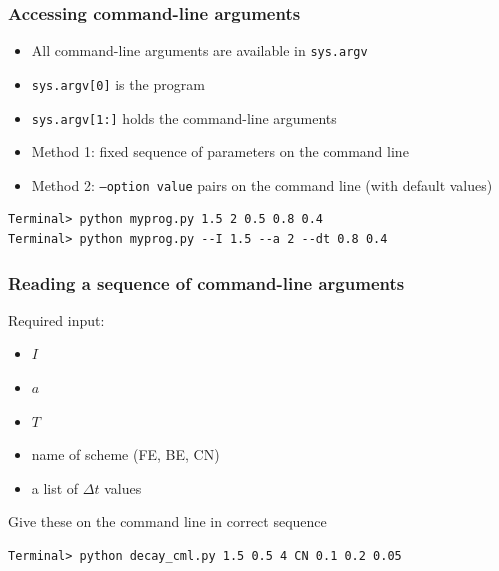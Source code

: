 \documentclass{beamer}
\begin{document}
\begin{frame}
\frametitle{Accessing command-line arguments}

\begin{itemize}
 \item All command-line arguments are available in \texttt{sys.argv}

 \item \texttt{sys.argv[0]} is the program

 \item \texttt{sys.argv[1:]} holds the command-line arguments

 \item Method 1: fixed sequence of parameters on the command line

 \item Method 2: \texttt{--option value} pairs on the command line (with default values)
\end{itemize}

\noindent
\begin{verbatim}
Terminal> python myprog.py 1.5 2 0.5 0.8 0.4
Terminal> python myprog.py --I 1.5 --a 2 --dt 0.8 0.4
\end{verbatim}
\end{frame}

\begin{frame}
\frametitle{Reading a sequence of command-line arguments}

Required input:

\begin{itemize}
 \item $I$

 \item $a$

 \item $T$

 \item name of scheme (FE, BE, CN)

 \item a list of $\Delta t$ values
\end{itemize}

\noindent
Give these on the command line in correct sequence

\begin{verbatim}
Terminal> python decay_cml.py 1.5 0.5 4 CN 0.1 0.2 0.05
\end{verbatim}
\end{frame}
\end{document}
